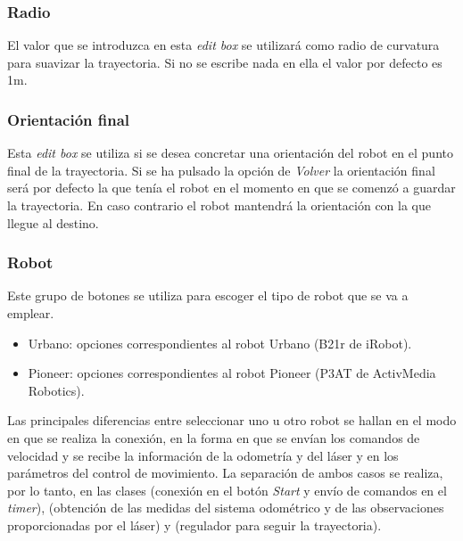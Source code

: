 \subsubsection{Radio}
El valor que se introduzca en esta \emph{edit box} se utilizará como radio de curvatura para suavizar la trayectoria. Si no se escribe nada en ella el valor por defecto es 1m.

\subsubsection{Orientación final}
Esta \emph{edit box} se utiliza si se desea concretar una orientación del robot en el punto final de la trayectoria. Si se ha pulsado la opción de \emph{Volver} la orientación final será por defecto la que tenía el robot en el momento en que se comenzó a guardar la trayectoria. En caso contrario el robot mantendrá la orientación con la que llegue al destino.

\subsubsection{Robot}
Este grupo de botones se utiliza para escoger el tipo de robot que se va a emplear.
\begin{itemize}
  \item Urbano: opciones correspondientes al robot Urbano (B21r de iRobot).
  \item Pioneer: opciones correspondientes al robot Pioneer (P3AT de ActivMedia Robotics).
\end{itemize}

Las principales diferencias entre seleccionar uno u otro robot se hallan en el modo en que se realiza la conexión, en la forma en que se envían los comandos de velocidad y se recibe la información de la odometría y del láser y en los parámetros del control de movimiento. La separación de ambos casos se realiza, por lo tanto, en las clases  (conexión en el botón \emph{Start} y envío de comandos en el \emph{timer}),  (obtención de las medidas del sistema odométrico y de las observaciones proporcionadas por el láser) y  (regulador para seguir la trayectoria).

